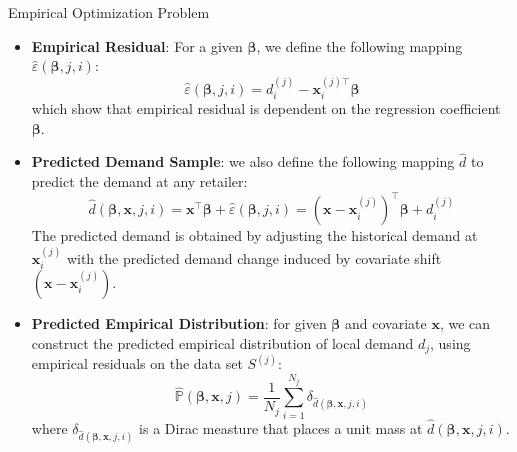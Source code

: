 \documentclass{beamer}
\newcommand{\txrd}[1]{{\textcolor{sintefred}{\textbf{#1}}}}
\newcommand{\bbp}{\mathbb{P}}
\begin{document}
\begin{frame}{Empirical Optimization Problem}

\begin{itemize}
    \item \txrd{Empirical Residual}: For a given ${\bm \beta}$, we define the following mapping $\hat{\varepsilon}({\bm \beta}, j, i)$:
    \[
    \hat{\varepsilon}({\bm \beta}, j, i)  = {d}_i^{(j)} - {\bm x}_i^{(j) \top} {\bm \beta}
    \]
    which show that empirical residual is dependent on the regression coefficient ${\bm \beta}$.
    \item \txrd{Predicted Demand Sample}: we also define the following mapping $\hat{d}$ to predict the demand at any retailer:
    \[
    \hat{d}({\bm \beta}, {\bm x}, j, i) = \bm x ^\top \bm \beta + \hat{\varepsilon}({\bm \beta}, j, i) = (\bm x - {\bm x}_i^{(j)})^ \top {\bm \beta} + {d}_i^{(j)}
    \]
    The predicted demand is obtained by adjusting the historical demand at ${\bm x}_i^{(j)}$ with the predicted demand change induced by covariate shift $(\bm x - {\bm x}_i^{(j)})$.
    \item \txrd{Predicted Empirical Distribution}: for given ${\bm \beta}$ and covariate ${\bm x}$, we can construct the predicted empirical distribution of local demand $d_j$, using empirical residuals on the data set $S^{(j)}$:
    \[
    \hat{\bbp}(\bm \beta,\bm x, j) = \frac{1}{N_j} \sum_{i=1}^{N_j} \delta_{\hat{d}({\bm \beta}, {\bm x}, j, i)}
    \]
    where $\delta_{\hat{d}({\bm \beta}, {\bm x}, j, i)}$ is a Dirac measture that places a unit mass at ${\hat{d}({\bm \beta}, {\bm x}, j, i)}$.
\end{itemize}
\end{frame}

\end{document}
